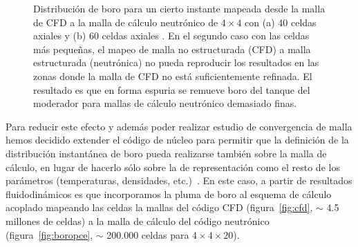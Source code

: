 \begin{figure}[t]
 \begin{center}
\hspace{\fill}
 \end{center}
\caption{\label{fig:4x4}Distribución de boro para un cierto instante mapeada desde la malla de CFD a la malla de cálculo neutrónico de $4 \times 4$ con (a) 40 celdas axiales y (b) 60 celdas axiales \cite{aatn-aet-2014}. En el segundo caso con las celdas más pequeñas, el mapeo de malla no estructurada (CFD) a malla estructurada (neutrónica) no pueda reproducir los resultados en las zonas donde la malla de CFD no está suficientemente refinada. El resultado es que en forma espuria se remueve boro del tanque del moderador para mallas de cálculo neutrónico demasiado finas.}
\end{figure}

Para reducir este efecto y además poder realizar estudio de convergencia de malla hemos decidido extender el código de núcleo para permitir que la definición de la distribución instantánea de boro pueda realizarse también sobre la malla de cálculo, en lugar de hacerlo sólo sobre la de representación como el resto de los parámetros (temperaturas, densidades, etc.)~\cite{aatn-pumita-2014}. En este caso, a partir de resultados fluidodinámicos es que incorporamos la pluma de boro al esquema de cálculo acoplado mapeando las celdas la mallas del código CFD (figura~\ref{fig:cfd}, $\sim$ 4.5 millones de celdas) a la malla de cálculo del código neutrónico (figura~\ref{fig:boropce}, $\sim$ 200.000 celdas para $4\times 4 \times 20$).





